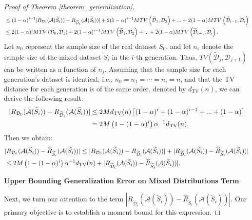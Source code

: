 \begin{proof}[Proof of Theorem \ref{theorem_generalization}]
\begin{align}
    &\leq (1-\alpha)^{i-1}|R_{\mathcal{D}_0}(\mathcal{A}(\widetilde{S}_i))-R_{\widetilde{\mathcal{D}}_{1}}(\mathcal{A}(\widetilde{S}_i))|+2(1-\alpha)^{i-1}MTV\left(\widetilde{\mathcal{D}}_{1},\mathcal{D}_{2}\right)+...+2(1-\alpha)MTV\left(\widetilde{\mathcal{D}}_{i-1},\mathcal{D}_{i}\right) \notag \\
    &\leq 2(1-\alpha)^iMTV\left(\mathcal{D}_{0},\mathcal{D}_{1}\right)+2(1-\alpha)^{i-1}MTV\left(\widetilde{\mathcal{D}}_{1},\mathcal{D}_{2}\right)+...+2(1-\alpha)MTV\left(\widetilde{\mathcal{D}}_{i-1},\mathcal{D}_{i}\right)\notag .
\end{align}
Let $n_0$ represent the sample size of the real dataset $S_0$, and let $n_i$ denote the sample size of the mixed dataset $\widetilde{S}_i$ in the $i$-th generation. Thus, $T V\left(\widetilde{\mathcal{D}}_j, \mathcal{D}_{j+1}\right)$ can be written as a function of $n_j$. Assuming that the sample size for each generation's dataset is identical, i.e., $n_0=n_1=\cdots=n_i=n$, and that the TV distance for each generation is of the same order, denoted by $d_{\mathrm{TV}}(n)$, we can derive the following result:
\begin{align}
    |R_{\mathcal{D}_0}(\mathcal{A}(\widetilde{S}_i))-R_{\widetilde{\mathcal{D}}_i}(\mathcal{A}(\widetilde{S}_i))|&\leq 2Md_{\mathrm{TV}}(n)\left[(1-\alpha)^i+(1-\alpha)^{i-1}+...+(1-\alpha)\right]\notag \\
    &=2M\left(1-(1-\alpha)^i\right)\alpha^{-1}d_{\mathrm{TV}}(n).
\end{align}
Then we obtain:
\begin{align}
&| R_{\mathcal{D}_0}(\mathcal{A}(\widetilde{S}_i))-\widehat{R}_{\widetilde{S}_i}(\mathcal{A}(\widetilde{S}_i))|\leq| R_{\mathcal{D}_0}(\mathcal{A}(\widetilde{S}_i))-R_{\widetilde{\mathcal{D}}_i}(\mathcal{A}(\widetilde{S}_i))|+|R_{\widetilde{\mathcal{D}}_i}(\mathcal{A}(\widetilde{S}_i))-\widehat{R}_{\widetilde{S}_i}(\mathcal{A}(\widetilde{S}_i))|\notag\\
&\leq 2M\left(1-(1-\alpha)^i\right)\alpha^{-1}d_{\mathrm{TV}}(n)+|R_{\widetilde{\mathcal{D}}_i}(\mathcal{A}(\widetilde{S}_i))-\widehat{R}_{\widetilde{S}_i}(\mathcal{A}(\widetilde{S}_i))|.
\end{align}








\textbf{Upper Bounding Generalization Error on Mixed Distributions Term}

Next, we turn our attention to the term $|R_{\widetilde{\mathcal{D}}_i}(\mathcal{A}(\widetilde{S}_i))-\widehat{R}_{\widetilde{S}_i}(\mathcal{A}(\widetilde{S}_i))|$. Our primary objective is to establish a moment bound for this expression.


\end{proof}
